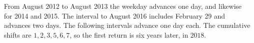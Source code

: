 From August 2012 to August 2013 the weekday advances one day, and likewise for 2014 and 2015. The interval to August 2016 includes February 29 and advances two days. The following intervals advance one day each. The cumulative shifts are $1,2,3,5,6,7$, so the first return is six years later, in $\boxed{2018}$.
